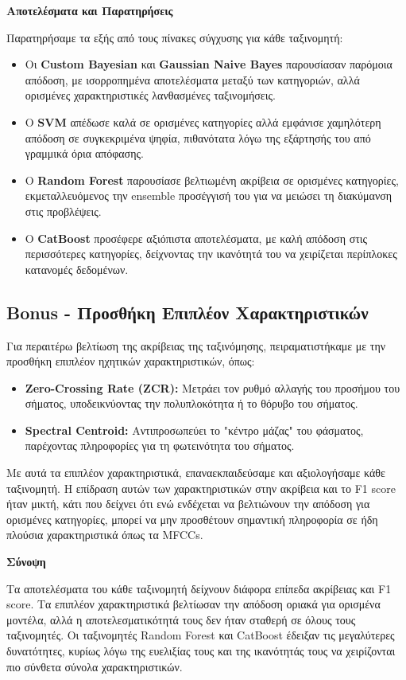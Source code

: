 \documentclass[a4paper,12pt]{article}
\begin{document}
\textbf{Αποτελέσματα και Παρατηρήσεις}

Παρατηρήσαμε τα εξής από τους πίνακες σύγχυσης για κάθε ταξινομητή:

\begin{itemize}
    \item Οι \textbf{Custom Bayesian} και \textbf{Gaussian Naive Bayes} παρουσίασαν παρόμοια απόδοση, με ισορροπημένα αποτελέσματα μεταξύ των κατηγοριών, αλλά ορισμένες χαρακτηριστικές λανθασμένες ταξινομήσεις.
    \item Ο \textbf{SVM} απέδωσε καλά σε ορισμένες κατηγορίες αλλά εμφάνισε χαμηλότερη απόδοση σε συγκεκριμένα ψηφία, πιθανότατα λόγω της εξάρτησής του από γραμμικά όρια απόφασης.
    \item Ο \textbf{Random Forest} παρουσίασε βελτιωμένη ακρίβεια σε ορισμένες κατηγορίες, εκμεταλλευόμενος την ensemble προσέγγισή του για να μειώσει τη διακύμανση στις προβλέψεις.
    \item Ο \textbf{CatBoost} προσέφερε αξιόπιστα αποτελέσματα, με καλή απόδοση στις περισσότερες κατηγορίες, δείχνοντας την ικανότητά του να χειρίζεται περίπλοκες κατανομές δεδομένων.
\end{itemize}

\subsection{Bonus - Προσθήκη Επιπλέον Χαρακτηριστικών}

Για περαιτέρω βελτίωση της ακρίβειας της ταξινόμησης, πειραματιστήκαμε με την προσθήκη επιπλέον ηχητικών χαρακτηριστικών, όπως:
\begin{itemize}
    \item \textbf{Zero-Crossing Rate (ZCR):} Μετράει τον ρυθμό αλλαγής του προσήμου του σήματος, υποδεικνύοντας την πολυπλοκότητα ή το θόρυβο του σήματος.
    \item \textbf{Spectral Centroid:} Αντιπροσωπεύει το "κέντρο μάζας" του φάσματος, παρέχοντας πληροφορίες για τη φωτεινότητα του σήματος.
\end{itemize}
Με αυτά τα επιπλέον χαρακτηριστικά, επαναεκπαιδεύσαμε και αξιολογήσαμε κάθε ταξινομητή. Η επίδραση αυτών των χαρακτηριστικών στην ακρίβεια και το F1 score ήταν μικτή, κάτι που δείχνει ότι ενώ ενδέχεται να βελτιώνουν την απόδοση για ορισμένες κατηγορίες, μπορεί να μην προσθέτουν σημαντική πληροφορία σε ήδη πλούσια χαρακτηριστικά όπως τα MFCCs.

\textbf{Σύνοψη}

Τα αποτελέσματα του κάθε ταξινομητή δείχνουν διάφορα επίπεδα ακρίβειας και F1 score. Τα επιπλέον χαρακτηριστικά βελτίωσαν την απόδοση οριακά για ορισμένα μοντέλα, αλλά η αποτελεσματικότητά τους δεν ήταν σταθερή σε όλους τους ταξινομητές. Οι ταξινομητές Random Forest και CatBoost έδειξαν τις μεγαλύτερες δυνατότητες, κυρίως λόγω της ευελιξίας τους και της ικανότητάς τους να χειρίζονται πιο σύνθετα σύνολα χαρακτηριστικών.
\end{document}
